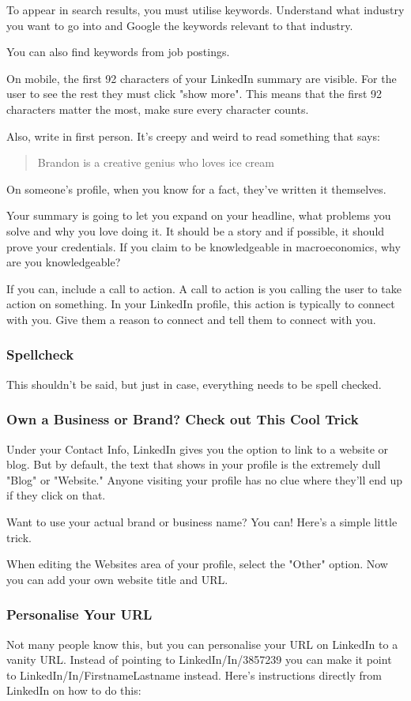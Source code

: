 \documentclass{article}
\begin{document}
To appear in search results, you must utilise keywords. Understand what
industry you want to go into and Google the keywords relevant to that
industry.

You can also find keywords from job postings.

On mobile, the first 92 characters of your LinkedIn summary are visible.
For the user to see the rest they must click "show more". This means
that the first 92 characters matter the most, make sure every character
counts.

Also, write in first person. It's creepy and weird to read something
that says:

\begin{quote}Brandon is a creative genius who loves ice cream\end{quote}

On someone's profile, when you know for a fact, they've written it
themselves.

Your summary is going to let you expand on your headline, what problems
you solve and why you love doing it. It should be a story and if
possible, it should prove your credentials. If you claim to be
knowledgeable in macroeconomics, why are you knowledgeable?

If you can, include a call to action. A call to action is you calling
the user to take action on something. In your LinkedIn profile, this
action is typically to connect with you. Give them a reason to connect
and tell them to connect with you.
\subsubsection{Spellcheck}
This shouldn't be said, but just in case, everything needs to be spell
checked.
\subsubsection{Own a Business or Brand? Check out This Cool Trick}
Under your Contact Info, LinkedIn gives you the option to link to a
website or blog. But by default, the text that shows in your profile is
the extremely dull "Blog" or "Website." Anyone visiting your profile has
no clue where they'll end up if they click on that.

Want to use your actual brand or business name? You can! Here's a simple
little trick.

When editing the Websites area of your profile, select the "Other"
option. Now you can add your own website title and URL.
\subsubsection{Personalise Your URL}
Not many people know this, but you can personalise your URL on LinkedIn
to a vanity URL. Instead of pointing to LinkedIn/In/3857239 you can make
it point to LinkedIn/In/FirstnameLastname instead. Here's instructions
directly from LinkedIn on how to do this:
\end{document}
